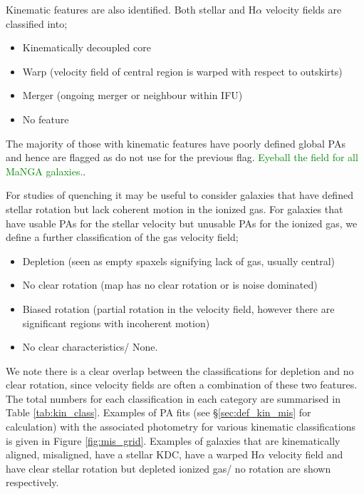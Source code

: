 \documentclass[fleqn,usenatbib]{mnras}
\newcommand{\green}[1]{{\textcolor{green}{#1}}}
\begin{document}
Kinematic features are also identified. Both stellar and H$\alpha$ velocity fields are classified into;
\begin{itemize}
    \item Kinematically decoupled core
    \item Warp (velocity field of central region is warped with respect to outskirts)
    \item Merger (ongoing merger or neighbour within IFU)
    \item No feature
\end{itemize}
The majority of those with kinematic features have poorly defined global PAs and hence are flagged as do not use for the previous flag. \green{Eyeball the field for all MaNGA galaxies.}. 

For studies of quenching it may be useful to consider galaxies that have defined stellar rotation but lack coherent motion in the ionized gas. For galaxies that have usable PAs for the stellar velocity but unusable PAs for the ionized gas, we define a further classification of the gas velocity field;
\begin{itemize}
    \item Depletion (seen as empty spaxels signifying lack of gas, usually central)
    \item No clear rotation (map has no clear rotation or is noise dominated)
    \item Biased rotation (partial rotation in the velocity field, however there are significant regions with incoherent motion)
    \item No clear characteristics/ None.
\end{itemize}
We note there is a clear overlap between the classifications for depletion and no clear rotation, since velocity fields are often a combination of these two features. The total numbers for each classification in each category are summarised in Table \ref{tab:kin_class}. Examples of PA fits (see \S\ref{sec:def_kin_mis} for calculation) with the associated photometry for various kinematic classifications is given in Figure \ref{fig:mis_grid}. Examples of galaxies that are kinematically aligned, misaligned, have a stellar KDC, have a warped H$\alpha$ velocity field and have clear stellar rotation but depleted ionized gas/ no rotation are shown respectively. 
\end{document}
